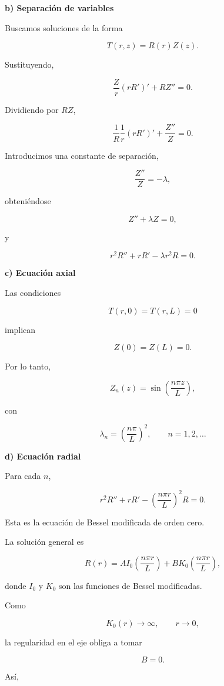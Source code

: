 \documentclass[11pt,spanish]{article}
\begin{document}
{\bf b) Separación de variables}

Buscamos soluciones de la forma

\[
T(r,z)=R(r)Z(z).
\]

Sustituyendo,

\[
\frac{Z}{r}(rR')'
+
RZ''=0.
\]

Dividiendo por \(RZ\),

\[
\frac1R
\frac1r(rR')'
+
\frac{Z''}{Z}
=0.
\]

Introducimos una constante de separación,

\[
\frac{Z''}{Z}
=
-\lambda,
\]

obteniéndose

\[
Z''+\lambda Z=0,
\]

y

\[
r^2R''
+rR'
-\lambda r^2R=0.
\]


{\bf c) Ecuación axial}

Las condiciones

\[
T(r,0)=T(r,L)=0
\]

implican

\[
Z(0)=Z(L)=0.
\]

Por lo tanto,

\[
Z_n(z)
=
\sin\!\left(\frac{n\pi z}{L}\right),
\]

con

\[
\boxed{
\lambda_n
=
\left(\frac{n\pi}{L}\right)^2,
\qquad
n=1,2,\ldots
}
\]


{\bf d) Ecuación radial}

Para cada \(n\),

\[
r^2R''
+rR'
-
\left(\frac{n\pi r}{L}\right)^2R=0.
\]

Esta es la ecuación de Bessel modificada de orden cero.

La solución general es

\[
R(r)
=
AI_0\!\left(\frac{n\pi r}{L}\right)
+
BK_0\!\left(\frac{n\pi r}{L}\right),
\]

donde \(I_0\) y \(K_0\) son las funciones de Bessel modificadas.

Como

\[
K_0(r)\rightarrow\infty,
\qquad
r\rightarrow0,
\]

la regularidad en el eje obliga a tomar

\[
B=0.
\]

Así,
\end{document}
